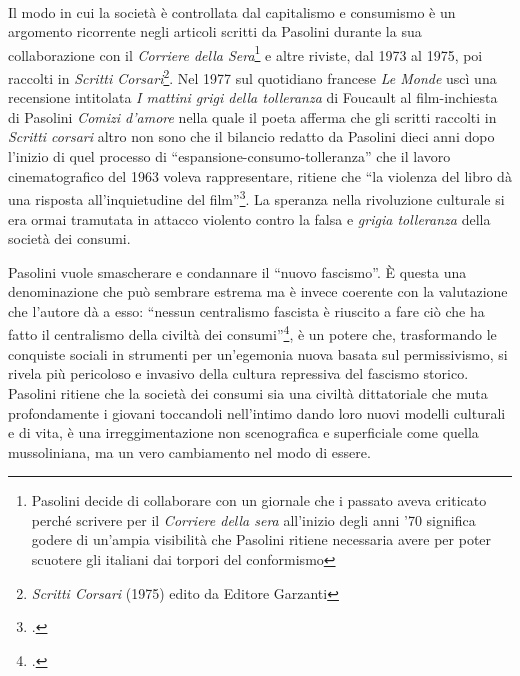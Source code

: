 \paragraph{}Il modo in cui la società è controllata dal capitalismo e consumismo è un argomento ricorrente negli articoli scritti da Pasolini durante la sua collaborazione con il \textit{Corriere della Sera}\footnote{Pasolini decide di collaborare con un giornale che i passato aveva criticato perché scrivere per il \textit{Corriere della sera} all'inizio degli anni '70 significa godere di un'ampia visibilità che Pasolini ritiene necessaria avere per poter scuotere gli italiani dai torpori del conformismo} e altre riviste, dal 1973 al 1975, poi raccolti in \textit{Scritti Corsari}\footnote{\textit{Scritti Corsari} (1975) edito da Editore Garzanti}.
Nel 1977 sul quotidiano francese \textit{Le Monde} uscì una recensione intitolata \textit{I mattini grigi della tolleranza} di Foucault al film-inchiesta di Pasolini \textit{Comizi d'amore} nella quale il poeta afferma che gli scritti raccolti in \textit{Scritti corsari} altro non sono che il bilancio redatto da Pasolini dieci anni dopo l'inizio di quel processo di \enquote{espansione-consumo-tolleranza} che il lavoro cinematografico del 1963 voleva rappresentare, ritiene che \enquote{la violenza del libro dà una risposta all'inquietudine del film}\footcite{Foucault}.
La speranza nella rivoluzione culturale si era ormai tramutata in attacco violento contro la falsa e \textit{grigia tolleranza} della società dei consumi.

Pasolini vuole smascherare e condannare il \enquote{nuovo fascismo}.
È questa una denominazione che può sembrare estrema ma è invece coerente con la valutazione che l'autore dà a esso: \enquote{nessun centralismo fascista è riuscito a fare ciò che ha fatto il centralismo della civiltà dei consumi}\footcite{Scritti1}, è un potere che, trasformando le conquiste sociali in strumenti per un'egemonia nuova basata sul permissivismo, si rivela più pericoloso e invasivo della cultura repressiva del fascismo storico.
Pasolini ritiene che la società dei consumi sia una civiltà dittatoriale che muta profondamente i giovani toccandoli nell'intimo dando loro nuovi modelli culturali e di vita, è una irreggimentazione non scenografica e superficiale come quella mussoliniana, ma un vero cambiamento nel modo di essere.


